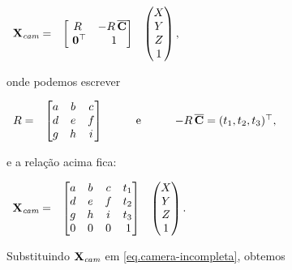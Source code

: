 \begin{center}
$
\begin{array}{ccc}
\mathbf{X}_{\textit{cam}}=
&
\begin{bmatrix}
R&-R\,\overline{\bf C}\\
\,\,{\bf 0}^\top&\,\,1
\end{bmatrix}
&
\begin{pmatrix}
X\\
Y\\
Z\\
1
\end{pmatrix},
\end{array}
$
\end{center} 
onde podemos escrever

\begin{center}
$
\begin{array}{cccc}
R=
&
\begin{bmatrix}
a&b&c\\
d&e&f\\
g&h&i
\end{bmatrix}
&
\qquad\text{e}\qquad
&
-R\,\overline{\bf C}=(t_1,t_2,t_3)^\top,
\end{array}
$
\end{center}
e a relação acima fica:
\begin{center}
$
\begin{array}{ccc}
\mathbf{X}_{\textit{cam}}=
&
\begin{bmatrix}
a&b&c&t_1\\
d&e&f&t_2\\
g&h&i&t_3\\
0&0&0&\,1
\end{bmatrix}
&
\begin{pmatrix}
X\\
Y\\
Z\\
1
\end{pmatrix}.
\end{array}
$
\end{center}
Substituindo $\mathbf{X}_{\textit{cam}}$ em \ref{eq.camera-incompleta}, obtemos

